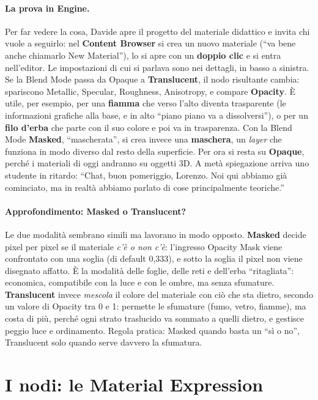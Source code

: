 \paragraph{La prova in Engine.} Per far vedere la cosa, Davide apre il progetto del
materiale didattico e invita chi vuole a seguirlo: nel \textbf{Content Browser} si crea
un nuovo materiale (``va bene anche chiamarlo New Material''), lo si apre con un
\textbf{doppio clic} e si entra nell'editor. Le impostazioni di cui si parlava sono nei
dettagli, in basso a sinistra. Se la Blend Mode passa da Opaque a \textbf{Translucent},
il nodo risultante cambia: spariscono Metallic, Specular, Roughness, Anisotropy, e
compare \textbf{Opacity}. È utile, per esempio, per una \textbf{fiamma} che verso l'alto
diventa trasparente (le informazioni grafiche alla base, e in alto ``piano piano va a
dissolversi''), o per un \textbf{filo d'erba} che parte con il suo colore e poi va in
trasparenza. Con la Blend Mode \textbf{Masked}, ``mascherata'', si crea invece una
\textbf{maschera}, un \emph{layer} che funziona in modo diverso dal resto della
superficie. Per ora si resta su \textbf{Opaque}, perché i materiali di oggi andranno su
oggetti 3D. A metà spiegazione arriva uno studente in ritardo: ``Chat, buon pomeriggio,
Lorenzo. Noi qui abbiamo già cominciato, ma in realtà abbiamo parlato di cose
principalmente teoriche.''

\paragraph{Approfondimento: Masked o Translucent?} Le due modalità sembrano simili ma
lavorano in modo opposto. \textbf{Masked} decide pixel per pixel se il materiale
\emph{c'è o non c'è}: l'ingresso Opacity Mask viene confrontato con una soglia (di
default 0,333), e sotto la soglia il pixel non viene disegnato affatto. È la modalità
delle foglie, delle reti e dell'erba ``ritagliata'': economica, compatibile con la
luce e con le ombre, ma senza sfumature. \textbf{Translucent} invece \emph{mescola} il
colore del materiale con ciò che sta dietro, secondo un valore di Opacity tra 0 e 1:
permette le sfumature (fumo, vetro, fiamme), ma costa di più, perché ogni strato
traslucido va sommato a quelli dietro, e gestisce peggio luce e ordinamento. Regola
pratica: Masked quando basta un ``sì o no'', Translucent solo quando serve davvero la
sfumatura.

\section{I nodi: le Material Expression}
\label{ue3:sec:nodi}

